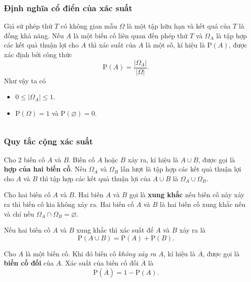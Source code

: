 \subsubsection{Định nghĩa cổ điển của xác suất}
\begin{dn}
	Giả sử phép thử $T$ có không gian mẫu $\Omega$ là một tập hữu hạn và kết quả của $T$ là đồng khả năng. Nếu $A$ là một biến cố liên quan đến phép thử $T$ và $\Omega_A$ là tập hợp các kết quả thuận lợi cho $A$ thì xác suất của $A$ là một số, kí hiệu là $\mathrm{P}(A)$, được xác định bởi công thức
	$$\mathrm{P}(A) = \frac{\vert \Omega_A \vert}{\vert \Omega \vert}.$$
	Như vậy ta có
	\begin{itemize}
		\item $0 \leq \vert \Omega_A \vert \leq 1$.
		\item $\mathrm{P}(\Omega) = 1$ và $\mathrm{P}(\varnothing) = 0$.
	\end{itemize}
		
	\[\]
\end{dn}

\subsubsection{Quy tắc cộng xác suất}
\begin{dn}
	Cho 2 biến cố $A$ và $B$. Biến cố $A$ hoặc $B$ xảy ra, kí hiệu là $A \cup B$, được gọi là \textbf{hợp của hai biến cố}. Nếu $\Omega_A$ và $\Omega_B$ lần lượt là tập hợp các kết quả thuận lợi cho $A$ và $B$ thì tập hợp các kết quả thuận lợi của $A\cup B$ là $\Omega_A \cup \Omega_B$. 
\end{dn}

\begin{dn}
	Cho hai biến cố $A$ và $B$. Hai biến $A$ và $B$ gọi là \textbf{xung khắc} nếu biến cố này xảy ra thì biến cố kia không xảy ra. Hai biến cố $A$ và $B$ là hai biến cố xung khắc nếu và chỉ nếu $\Omega_A \cap \Omega_B = \varnothing$.
\end{dn}

\begin{dl}
	Nếu hai biến cố $A$ và $B$ xung khắc thì xác suất để $A$ và $B$ xảy ra là
	\[\mathrm{P}(A \cup B) = \mathrm{P}(A) + \mathrm{P}(B).\]
\end{dl}

\begin{dl}
	Cho $A$ là một biến cố. Khi đó biến cố \textit{không xảy ra $A$}, kí hiệu là $\overline{A}$, được gọi là \textbf{biến cố đối} của $A$. Xác suất của biến cố đối $\overline{A}$ là
	\[\mathrm{P}(\overline{A}) = 1 - \mathrm{P}(A).\]
\end{dl}

